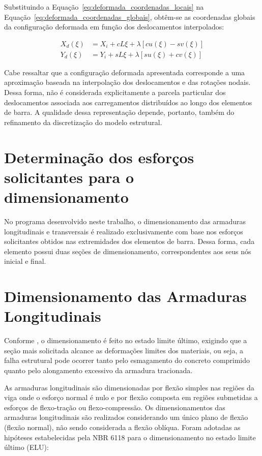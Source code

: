 Substituindo a Equação~\eqref{eq:deformada_coordenadas_locais} na Equação~\eqref{eq:deformada_coordenadas_globais}, obtêm-se as coordenadas globais da configuração deformada em função dos deslocamentos interpolados:

\begin{equation}
    \begin{aligned}
        X_d(\xi) &=
        X_i+cL\xi+
        \lambda\left[cu(\xi)-sv(\xi)\right] \\
        Y_d(\xi) &=
        Y_i+sL\xi+
        \lambda\left[su(\xi)+cv(\xi)\right]
    \end{aligned}
    \label{eq:deformada_coordenadas_finais}
\end{equation}

Cabe ressaltar que a configuração deformada apresentada corresponde a uma aproximação baseada na interpolação dos deslocamentos e das rotações nodais. Dessa forma, não é considerada explicitamente a parcela particular dos deslocamentos associada aos carregamentos distribuídos ao longo dos elementos de barra. A qualidade dessa representação depende, portanto, também do refinamento da discretização do modelo estrutural.

\section{Determinação dos esforços solicitantes para o dimensionamento}

No programa desenvolvido neste trabalho, o dimensionamento das armaduras longitudinais e transversais é realizado exclusivamente com base nos esforços solicitantes obtidos nas extremidades dos elementos de barra. Dessa forma, cada elemento possui duas seções de dimensionamento, correspondentes aos seus nós inicial e final.


\section{Dimensionamento das Armaduras Longitudinais}

Conforme , o dimensionamento é feito no estado limite último, exigindo que a seção mais solicitada alcance as deformações limites dos materiais, ou seja, a falha estrutural pode ocorrer tanto pelo esmagamento do concreto comprimido quanto pelo alongamento excessivo da armadura tracionada.

As armaduras longitudinais são dimensionadas por flexão simples nas regiões da viga onde o esforço normal é nulo e por flexão composta em regiões submetidas a esforços de flexo-tração ou flexo-compressão. Os dimensionamentos das armaduras longitudinais são realizados considerando um único plano de flexão (flexão normal), não sendo considerada a flexão oblíqua. Foram adotadas as hipóteses estabelecidas pela NBR 6118  para o dimensionamento no estado limite último (ELU):


